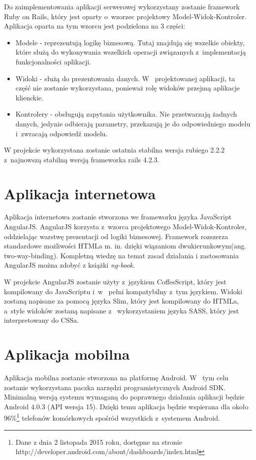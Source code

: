 \documentclass[eng,archivemode]{mgr}
\begin{document}
Do zaimplementowania aplikacji serwerowej wykorzystany zostanie framework Ruby on Rails, który jest oparty o~wzorzec projektowy Model-Widok-Kontroler\cite{rails agile}. Aplikacja oparta na tym wzorcu jest podzielona na 3 części:
\begin{itemize}
	\item Modele - reprezentują logikę biznesową. Tutaj znajdują się wszelkie obiekty, które służą do wykonywania wszelkich operacji związanych z~implementacją funkcjonalności aplikacji.
	\item Widoki - służą do prezentowania danych. W~ projektowanej aplikacji, ta część nie zostanie wykorzystana, ponieważ rolę widoków przejmą aplikacje klienckie. 
	\item Kontrolery - obsługują zapytania użytkownika. Nie przetwarzają żadnych danych, jedynie odbierają parametry, przekazują je do odpowiedniego modelu i~zwracają odpowiedź modelu.
\end{itemize}
W projekcie wykorzystana zostanie ostatnia stabilna wersja rubiego 2.2.2 z~najnowszą stabilną wersją frameworka rails 4.2.3.
\section{Aplikacja internetowa}

Aplikacja internetowa zostanie stworzona we frameworku języka JavaScript AngularJS. AngularJS korzysta z~wzorca projektowego Model-Widok-Kontroler, oddzielając warstwę prezentacji od logiki biznesowej. Framework rozszerza standardowe możliwości HTMLa m. in. dzięki wiązaniom dwukierunkowym(ang. two-way-binding). Kompletną wiedzę na temat zasad działania i zastosowania AngularJS można zdobyć z książki \emph{ng-book}\cite{ng-book}.

W projekcie AngularJS zostanie użyty z~językiem CoffesScript, który jest kompilowany do JavaScriptu i~w~ pełni kompatybilny z~tym językiem. Widoki zostaną napisane za pomocą języka Slim, który jest kompilowany do HTMLa, a~style widoków zostaną napisane z~ wykorzystaniem języka SASS, który jest interpretowany do CSSa.

\section{Aplikacja mobilna}
Aplikacja mobilna zostanie stworzona na platformę Android. W~ tym celu zostanie wykorzystana paczka narzędzi programistycznych Android SDK. Minimalną wersją systemu wymaganą do poprawnego działania aplikacji będzie Android 4.0.3 (API wersja 15). Dzięki temu aplikacja będzie wspierana dla około 96\%\footnote{Dane z dnia 2 listopada 2015 roku, dostępne na stronie http://developer.android.com/about/dashboards/index.html} telefonów komórkowych spośród wszystkich z~systemem Android.
\end{document}
